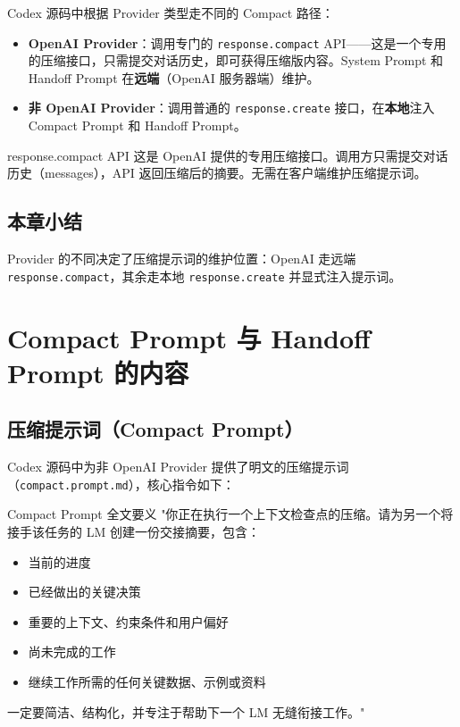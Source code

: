\documentclass[a4paper]{article}
\begin{document}
Codex 源码中根据 Provider 类型走不同的 Compact 路径：

\begin{itemize}
    \item \textbf{OpenAI Provider}：调用专门的 \texttt{response.compact} API——这是一个专用的压缩接口，只需提交对话历史，即可获得压缩版内容。System Prompt 和 Handoff Prompt 在\textbf{远端}（OpenAI 服务器端）维护。
    \item \textbf{非 OpenAI Provider}：调用普通的 \texttt{response.create} 接口，在\textbf{本地}注入 Compact Prompt 和 Handoff Prompt。
\end{itemize}

\begin{knowledgebox}{response.compact API}
这是 OpenAI 提供的专用压缩接口。调用方只需提交对话历史（messages），API 返回压缩后的摘要。无需在客户端维护压缩提示词。
\end{knowledgebox}

\subsection{本章小结}

Provider 的不同决定了压缩提示词的维护位置：OpenAI 走远端 \texttt{response.compact}，其余走本地 \texttt{response.create} 并显式注入提示词。


\section{Compact Prompt 与 Handoff Prompt 的内容}

\subsection{压缩提示词（Compact Prompt）}

Codex 源码中为非 OpenAI Provider 提供了明文的压缩提示词（\texttt{compact.prompt.md}），核心指令如下：

\begin{importantbox}{Compact Prompt 全文要义}
"你正在执行一个上下文检查点的压缩。请为另一个将接手该任务的 LM 创建一份交接摘要，包含：
\begin{itemize}
    \item 当前的进度
    \item 已经做出的关键决策
    \item 重要的上下文、约束条件和用户偏好
    \item 尚未完成的工作
    \item 继续工作所需的任何关键数据、示例或资料
\end{itemize}
一定要简洁、结构化，并专注于帮助下一个 LM 无缝衔接工作。"
\end{importantbox}
\end{document}
